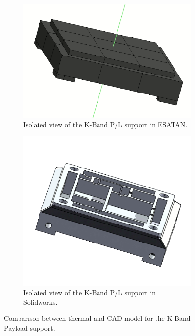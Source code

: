 \begin{figure}[H]
  \centering
  \begin{subfigure}{.5\textwidth}
    \centering
    \includegraphics[width=.6\linewidth]{res/img/5_simulationanalisys/Comparisons/ESATAN/kbandsupp.PNG}
    \caption{Isolated view of the K-Band P/L support in ESATAN.}
    \label{fig:kbandsupport}
  \end{subfigure}%
  \begin{subfigure}{.5\textwidth}
    \centering
    \includegraphics[width=.5\linewidth]{res/img/5_simulationanalisys/Comparisons/SLDW/kbandsupp_Solid.PNG}
    \caption{Isolated view of the K-Band P/L support in Solidworks.}
    \label{fig:kbandsupportsolid}
  \end{subfigure}
  \caption{Comparison between thermal and CAD model for the K-Band Payload support.}
  \label{fig:kbandsupportsolidim}
\end{figure}

